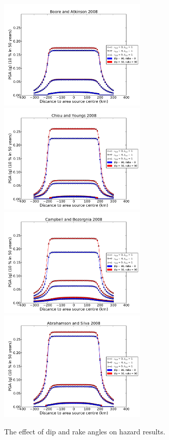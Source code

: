 \begin{figure}
\centering
\includegraphics[width=7cm]{./Pictures/PGA_0pt1_BA2008_dip_rake.pdf}
\includegraphics[width=7cm]{./Pictures/PGA_0pt1_CY2008_dip_rake.pdf}
\includegraphics[width=7cm]{./Pictures/PGA_0pt1_CB2008_dip_rake.pdf}
\includegraphics[width=7cm]{./Pictures/PGA_0pt1_AS2008_dip_rake.pdf}
\caption{The effect of dip and rake angles on hazard results.}
\label{fig:dip_rake_area}
\end{figure}

